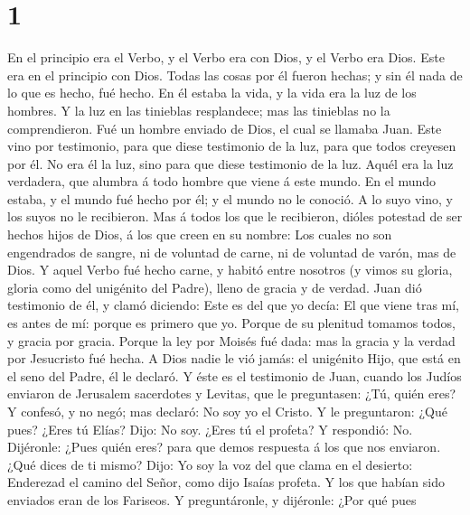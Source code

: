 \hypertarget{section}{%
\section{1}\label{section}}

 En el principio era el Verbo, y el Verbo era con Dios, y el
Verbo era Dios.  Este era en el principio con Dios.
 Todas las cosas por él fueron hechas; y sin él nada de lo
que es hecho, fué hecho.  En él estaba la vida, y la vida
era la luz de los hombres.  Y la luz en las tinieblas
resplandece; mas las tinieblas no la comprendieron.  Fué un
hombre enviado de Dios, el cual se llamaba Juan.  Este vino
por testimonio, para que diese testimonio de la luz, para que todos
creyesen por él.  No era él la luz, sino para que diese
testimonio de la luz.  Aquél era la luz verdadera, que
alumbra á todo hombre que viene á este mundo.  En el mundo
estaba, y el mundo fué hecho por él; y el mundo no le conoció.
 A lo suyo vino, y los suyos no le recibieron.
 Mas á todos los que le recibieron, dióles potestad de ser
hechos hijos de Dios, á los que creen en su nombre:  Los
cuales no son engendrados de sangre, ni de voluntad de carne, ni de
voluntad de varón, mas de Dios.  Y aquel Verbo fué hecho
carne, y habitó entre nosotros (y vimos su gloria, gloria como del
unigénito del Padre), lleno de gracia y de verdad.  Juan
dió testimonio de él, y clamó diciendo: Este es del que yo decía: El que
viene tras mí, es antes de mí: porque es primero que yo. 
Porque de su plenitud tomamos todos, y gracia por gracia. 
Porque la ley por Moisés fué dada: mas la gracia y la verdad por
Jesucristo fué hecha.  A Dios nadie le vió jamás: el
unigénito Hijo, que está en el seno del Padre, él le declaró.
 Y éste es el testimonio de Juan, cuando los Judíos
enviaron de Jerusalem sacerdotes y Levitas, que le preguntasen: ¿Tú,
quién eres?  Y confesó, y no negó; mas declaró: No soy yo
el Cristo.  Y le preguntaron: ¿Qué pues? ¿Eres tú Elías?
Dijo: No soy. ¿Eres tú el profeta? Y respondió: No.~
Dijéronle: ¿Pues quién eres? para que demos respuesta á los que nos
enviaron. ¿Qué dices de ti mismo?  Dijo: Yo soy la voz del
que clama en el desierto: Enderezad el camino del Señor, como dijo
Isaías profeta.  Y los que habían sido enviados eran de los
Fariseos.  Y preguntáronle, y dijéronle: ¿Por qué pues
